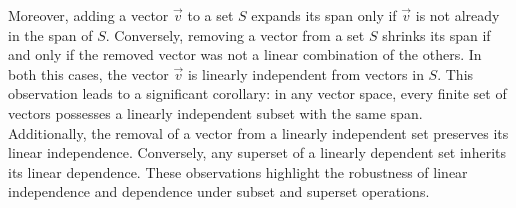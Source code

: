 Moreover, adding a vector $\vec{v}$ to a set $S$ expands its span only if $\vec{v}$ is not already in the span of $S$. Conversely, removing a vector from a set $S$ shrinks its span if and only if the removed vector was not a linear combination of the others. In both this cases, the vector $\vec v$ is linearly independent from vectors in $S$. This observation leads to a significant corollary: in any vector space, every finite set of vectors possesses a linearly independent subset with the same span.
\\

Additionally, the removal of a vector from a linearly independent set preserves its linear independence. Conversely, any superset of a linearly dependent set inherits its linear dependence. These observations highlight the robustness of linear independence and dependence under subset and superset operations.